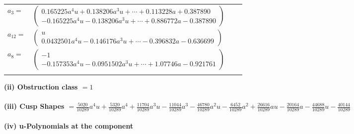 \documentclass[1p]{elsarticle_modified}
\theoremstyle{definition}
\begin{document}
\begin{tabular}{m{7pt} m{180pt} m{7pt} m{180pt} }
\flushright $a_{3}=$&$\begin{pmatrix}0.165225 a^{4} u+0.138206 a^{3} u+\cdots+0.113228 a+0.387890\\-0.165225 a^{4} u-0.138206 a^{3} u+\cdots+0.886772 a-0.387890\end{pmatrix}$ \\
\flushright $a_{12}=$&$\begin{pmatrix}u\\0.0432501 a^{4} u-0.146176 a^{3} u+\cdots-0.396832 a-0.636699\end{pmatrix}$ \\
\flushright $a_{8}=$&$\begin{pmatrix}-1\\-0.157353 a^{4} u-0.0951502 a^{3} u+\cdots+1.07746 a-0.921761\end{pmatrix}$\\&\end{tabular}
\flushleft \textbf{(ii) Obstruction class $= 1$}\\~\\
\flushleft \textbf{(iii) Cusp Shapes $= \frac{5020}{10289} a^4 u+\frac{5320}{10289} a^4+\frac{11704}{10289} a^3 u-\frac{11044}{10289} a^3-\frac{46780}{10289} a^2 u-\frac{6452}{10289} a^2+\frac{26616}{10289} a u-\frac{20164}{10289} a-\frac{44688}{10289} u-\frac{40144}{10289}$}\\~\\
\newpage\renewcommand{\arraystretch}{1}
\flushleft \textbf{(iv) u-Polynomials at the component}\newline \\
\end{document}
